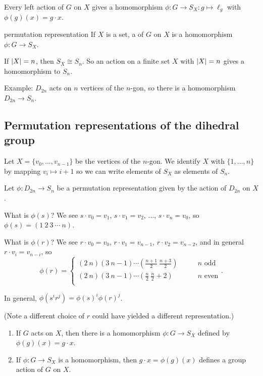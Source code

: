 \documentclass[12pt,letterpaper]{report}
\begin{document}
\begin{cor}{}{}
  Every left action of $G$ on $X$ gives a homomorphism $\phi \colon G \to S_X : g \mapsto \ell_g$
  with $\phi(g)(x) = g \cdot x$.
\end{cor}

\begin{defn}{permutation representation}{}
  If $X$ is a set, a  of $G$ on $X$ is a homomorphism
  $\phi \colon G \to S_X$.
\end{defn}

If $\lvert X\rvert = n$, then $S_X \cong S_n$.
So an action on a finite set $X$ with $\lvert X\rvert = n$ gives a homomorphism to $S_n$.

Example: $D_{2n}$ acts on $n$ vertices of the $n$-gon, so there is a homomorphism $D_{2n} \to S_n$.

\pagebreak
\subsection{Permutation representations of the dihedral group}

Let $X = \{v_0, \ldots, v_{n - 1}\}$ be the vertices of the $n$-gon.
We identify $X$ with $\{1, \ldots, n\}$ by mapping $v_i \mapsto i + 1$ so we can write elements of
$S_X$ as elements of $S_n$.

Let $\phi \colon D_{2n} \to S_n$ be a permutation representation given by the action of $D_{2n}$ on
$X$.

What is $\phi(s)$?
We see $s \cdot v_0 = v_1$, $s \cdot v_1 = v_2$, $\ldots$, $s \cdot v_n = v_0$, so
$\phi(s) = (1 \ 2 \ 3 \ \cdots \ n)$.

What is $\phi(r)$?
We see $r \cdot v_0 = v_0$, $r \cdot v_1 = v_{n - 1}$, $r \cdot v_2 = v_{n - 2}$, and in general
$r \cdot v_i = v_{n - i}$, so
\[
  \phi(r) = \begin{cases}
    (2 \ n)(3 \ n - 1) \cdots (\frac{n + 1}{2} \ \frac{n + 3}{2}) \qquad & n \text { odd} \\
    (2 \ n)(3 \ n - 1) \cdots (\frac{n}{2} \ \frac{n}{2} + 2) \qquad & n \text { even} \\
  \end{cases}.
\]

In general, $\phi(s^i r^j) = \phi(s)^i \phi(r)^j$.

(Note a different choice of $r$ could have yielded a different representation.)

\begin{thm}{}{}
  \begin{enumerate}
    \item If $G$ acts on $X$, then there is a homomorphism $\phi \colon G \to S_X$ defined by
      $\phi(g)(x) = g \cdot x$.
    \item If $\phi \colon G \to S_X$ is a homomorphism, then $g \cdot x = \phi(g)(x)$ defines a
      group action of $G$ on $X$.
  \end{enumerate}
\end{thm}
\end{document}
